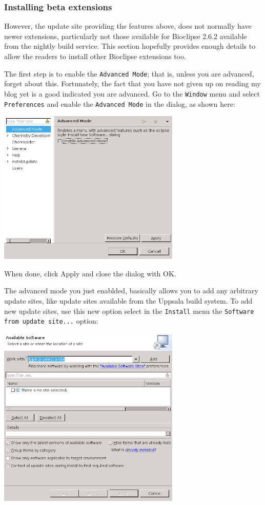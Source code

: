 \documentclass[a5paper, 10pt]{memoir}
\begin{document}
\begin{refsection}
\subsubsection{Installing beta extensions}

However, the update site providing the features above, does not normally have
newer extensions, particularly not those available for Bioclipse 2.6.2 available
from the nightly build service. This section hopefully provides enough details
to allow the readers to install other Bioclipse extensions too.

The first step is to enable the \texttt{Advanced Mode}; that is, unless you are
advanced, forget about this. Fortunately, the fact that you have not given up on
reading my blog yet is a good indicated you are advanced. Go to the
\texttt{Window} menu and select \texttt{Preferences} and enable the \texttt{Advanced Mode}
in the dialog, as shown here:

\begin{center}
\includegraphics[width=0.65\textwidth]{images/bcAdvancedMode.png}
\end{center}

When done, click Apply and close the dialog with OK. 

The advanced mode you just enablded, basically allows you to add any arbitrary
update sites, like update sites available from the Uppsala build system.
To add new update sites, use this new option select in the \texttt{Install} menu
the \texttt{Software from update site...} option:

\begin{center}
\includegraphics[width=0.65\textwidth]{images/bcUpdateSites.png}
\end{center}


\end{refsection}
\end{document}
